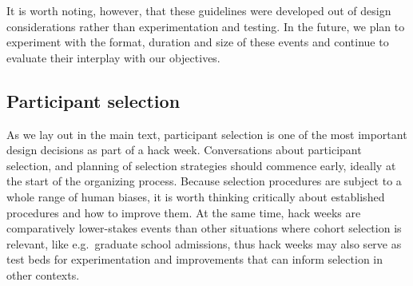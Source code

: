 \documentclass{nature}
\begin{document}
It is worth noting, however, that these guidelines were developed out of design considerations rather than experimentation and testing. In the future, we plan to experiment with the format, duration and size of these events and continue to evaluate their interplay with our objectives.

\subsection{Participant selection}

As we lay out in the main text, participant selection is one of the most important design decisions as part of a hack week. Conversations about participant selection, and planning of selection strategies should commence early, ideally at the start of the organizing process.
Because selection procedures are subject to a whole range of human biases, it is worth thinking critically about established procedures and how to improve them. At the same time, hack weeks are comparatively lower-stakes events than other situations where cohort selection is relevant, like e.g.\ graduate school admissions, thus hack weeks may also serve as test beds for experimentation and improvements that can inform selection in other contexts.
\end{document}
